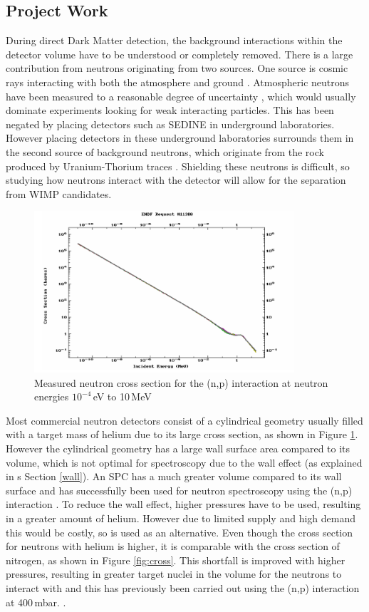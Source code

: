 \documentclass[a4paper]{article}
\begin{document}
\subsection{Project Work} \label{Project}
During direct Dark Matter detection, the background interactions within the detector volume have to be understood or completely removed. There is a large contribution from neutrons originating from two sources. One source is cosmic rays interacting with both the atmosphere and ground \cite{10.2307/984841,saxena}. Atmospheric neutrons have been measured to a reasonable degree of uncertainty \cite{flux}, which would usually dominate experiments looking for weak interacting particles. This has been negated by placing detectors such as SEDINE in underground laboratories. However placing detectors in these underground laboratories surrounds them in the second source of background neutrons, which originate from the rock produced by Uranium-Thorium traces \cite{TZIAFERI2007326}. Shielding these neutrons is difficult, so studying how neutrons interact with the detector will allow for the separation from WIMP candidates.
\begin{figure}[H]
    \centering
    \includegraphics[height=6cm]{Cross.png}
    \caption{Measured neutron cross section for the (n,p) interaction at neutron energies $10^{-4}$\,eV to 10\,MeV \cite{hnps2579}}
    \label{fig:cross1}
\end{figure}
\noindent Most commercial neutron detectors consist of a cylindrical geometry usually filled with a target mass of helium due to its large cross section, as shown in Figure \ref{fig:cross1}. However the cylindrical geometry has a large wall surface area compared to its volume, which is not optimal for spectroscopy due to the wall effect (as explained in s
Section \ref{wall}). An SPC has a much greater volume compared to its wall surface and has successfully been used for neutron spectroscopy using the (n,p) interaction \cite{hnps2579}. To reduce the wall effect, higher pressures have to be used, resulting in a greater amount of helium. However due to limited supply and high demand this would be costly, so  is used as an alternative. Even though the cross section for neutrons with helium is higher, it is comparable with the cross section of nitrogen, as shown in Figure \ref{fig:cross}. This shortfall is improved with higher pressures, resulting in greater target nuclei in the volume for the neutrons to interact with and this has previously been carried out using the (n,p) interaction at 400\,mbar. \cite{BOUGAMONT201710}. 
\end{document}
